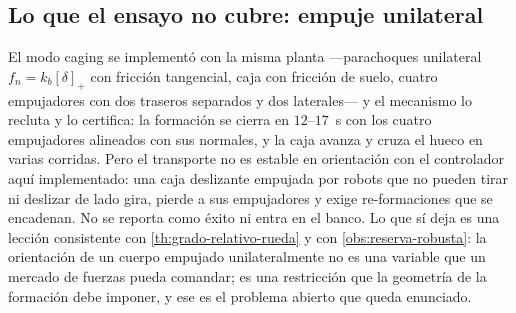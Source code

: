 







\subsection{Lo que el ensayo no cubre: empuje unilateral}

El modo \textsf{caging} se implementó con la misma planta —parachoques
unilateral $f_n=k_b[\delta]_+$ con fricción tangencial, caja con fricción de
suelo, cuatro empujadores con dos traseros separados y dos laterales— y el
mecanismo lo recluta y lo certifica: la formación se cierra en $12$--$17$~s con
los cuatro empujadores alineados con sus normales, y la caja avanza y cruza el
hueco en varias corridas. Pero el transporte no es estable en orientación con
el controlador aquí implementado: una caja deslizante empujada por robots que
no pueden tirar ni deslizar de lado gira, pierde a sus empujadores y exige
re-formaciones que se encadenan. No se reporta como éxito ni entra en el
banco. Lo que sí deja es una lección consistente con
\cref{th:grado-relativo-rueda} y con \cref{obs:reserva-robusta}: la
orientación de un cuerpo empujado unilateralmente no es una variable que un
mercado de fuerzas pueda comandar; es una restricción que la geometría de la
formación debe imponer, y ese es el problema abierto que queda enunciado.
